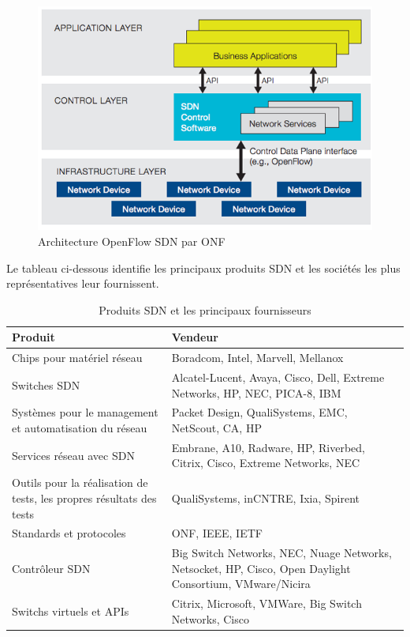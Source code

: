 \begin{figure}[!h] %
\includegraphics[width=15cm]{images/openflowArchi.png} %
\caption{ Architecture OpenFlow SDN par ONF \cite{SDNNewNormONFExecutiveSummary}} %
\label{imgArchi} %
\end{figure} %
 
Le tableau ci-dessous identifie les principaux produits SDN et les sociétés les plus représentatives leur fournissent.

\begin{table}[!h]
\centering
\begin{tabular}{|p{6cm}|p{9cm}|}
\hline 
\bf Produit & \bf Vendeur \\ 
\hline 
Chips pour matériel réseau & Boradcom, Intel, Marvell, Mellanox \\ 
\hline 
Switches SDN & Alcatel-Lucent, Avaya, Cisco, Dell, Extreme Networks, HP, NEC, PICA-8, IBM \\ 
\hline 
Systèmes pour le management et automatisation du réseau & Packet Design, QualiSystems, EMC, NetScout, CA, HP \\ 
\hline 
Services réseau avec SDN & Embrane, A10, Radware, HP, Riverbed, Citrix, Cisco,  Extreme Networks, NEC \\ 
\hline 
Outils pour la réalisation de tests, les propres résultats des tests & QualiSystems, inCNTRE, Ixia, Spirent \\ 
\hline 
Standards et protocoles & ONF, IEEE, IETF \\ 
\hline 
Contrôleur SDN & Big Switch Networks, NEC, Nuage Networks, Netsocket, HP, Cisco, Open Daylight Consortium, VMware/Nicira \\ 
\hline 
Switchs virtuels et APIs & Citrix, Microsoft, VMWare, Big Switch Networks, Cisco \\ 
\hline 
\end{tabular} 
\caption{Produits SDN et les principaux fournisseurs \cite{2013GuideSDNNVEcosystem}}
\end{table} 
 
